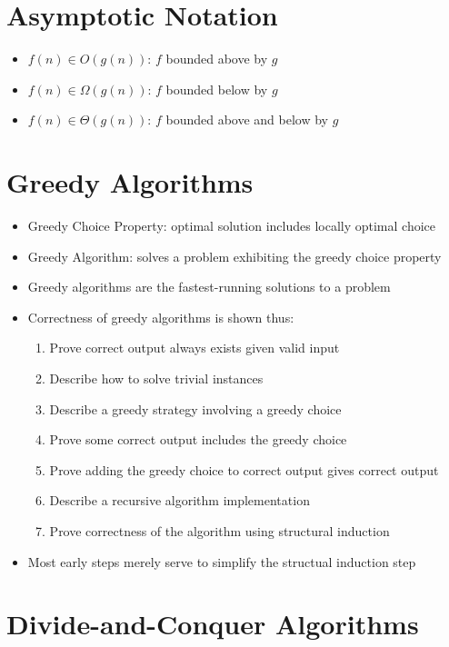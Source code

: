 \documentclass{article}
\begin{document}
\section{Asymptotic Notation}

\begin{itemize}
\item $f(n) \in O(g(n))$: $f$ bounded above by $g$
\item $f(n) \in \Omega (g(n))$: $f$ bounded below by $g$
\item $f(n) \in \Theta (g(n))$: $f$ bounded above and below by $g$
\end{itemize}

\section{Greedy Algorithms}

\begin{itemize}
\item Greedy Choice Property: optimal solution includes locally optimal choice
\item Greedy Algorithm: solves a problem exhibiting the greedy choice property
\item Greedy algorithms are the fastest-running solutions to a problem
\item Correctness of greedy algorithms is shown thus:
\begin{enumerate}
\item Prove correct output always exists given valid input
\item Describe how to solve trivial instances
\item Describe a greedy strategy involving a greedy choice
\item Prove some correct output includes the greedy choice
\item Prove adding the greedy choice to correct output gives correct output
\item Describe a recursive algorithm implementation
\item Prove correctness of the algorithm using structural induction
\end{enumerate}
\item Most early steps merely serve to simplify the structual induction step
\end{itemize}

\section{Divide-and-Conquer Algorithms}
\end{document}
